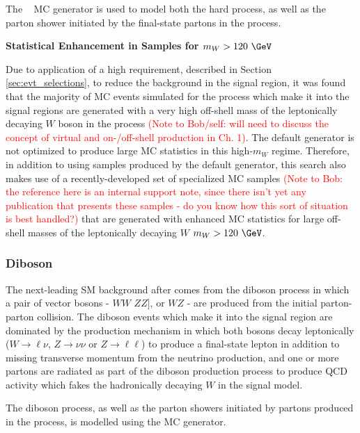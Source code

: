 The \SHERPA[2.2]~\cite{Gleisberg:2008ta} MC generator is used to model both the hard \wjets process, as well as the parton shower initiated by the final-state partons in the process. 

\textbf{Statistical Enhancement in \wjets Samples for \(m_W>120~\GeV\)}

Due to application of a high \mtlepmet requirement, described in Section \ref{sec:evt_selections}, to reduce the \wjets background in the signal region, it was found that the majority of MC events simulated for the \wjets process which make it into the signal regions are generated with a very high off-shell mass of the leptonically decaying \(W\) boson in the process \textcolor{red}{(Note to Bob/self: will need to discuss the concept of virtual and on-/off-shell production in Ch. 1)}. The default \SHERPA[2.2] generator is not optimized to produce large MC statistics in this high-\(m_W\) regime. Therefore, in addition to using samples produced by the default \SHERPA[2.2] generator, this search also makes use of a recently-developed set of specialized \SHERPA[2.2] \wjets MC samples \cite{Gignac:2753199} \textcolor{red}{(Note to Bob: the reference here is an internal support note, since there isn't yet any publication that presents these samples - do you know how this sort of situation is best handled?)} that are generated with enhanced MC statistics for large off-shell masses of the leptonically decaying \(W\) \(m_W > 120~\GeV\).

\subsubsection{Diboson}
\label{sec:diboson_description}

The next-leading SM background after \wjets comes from the diboson process in which a pair of vector bosons - \(WW\) \(ZZ]\), or \(WZ\) - are produced from the initial parton-parton collision. The diboson events which make it into the signal region are dominated by the production mechanism in which both bosons decay leptonically (\(W \rightarrow \ell\nu\), \(Z \rightarrow \nu\nu\) or \(Z \rightarrow \ell\ell\)) to produce a final-state lepton in addition to missing transverse momentum from the neutrino production, and one or more partons are radiated as part of the diboson production process to produce QCD activity which fakes the hadronically decaying \(W\) in the signal model. 

The diboson process, as well as the parton showers initiated by partons produced in the process, is modelled using the \SHERPA[2.2] MC generator. 


